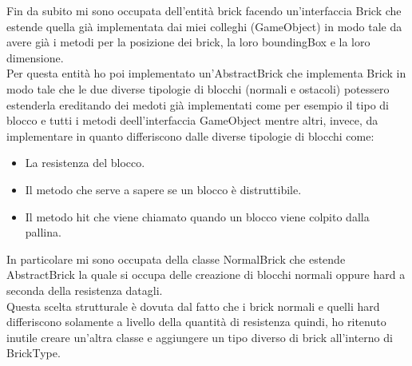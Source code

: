 \documentclass[a4paper,12pt]{report}
\begin{document}
Fin da subito mi sono occupata dell'entità brick facendo un'interfaccia Brick che estende quella già implementata dai miei colleghi (GameObject) in modo tale da avere già i metodi
per la posizione dei brick, la loro boundingBox e la loro dimensione.
\\Per questa entità ho poi implementato un'AbstractBrick che implementa Brick in modo tale che le due diverse tipologie di blocchi (normali e ostacoli) potessero estenderla ereditando dei medoti
già implementati come per esempio il tipo di blocco e tutti i metodi deell'interfaccia GameObject mentre altri, invece, da implementare in quanto differiscono dalle diverse tipologie di blocchi come:
\begin{itemize}
    \item La resistenza del blocco.
    \item Il metodo che serve a sapere se un blocco è distruttibile.
    \item Il metodo hit che viene chiamato quando un blocco viene colpito dalla pallina.
\end{itemize}
In particolare mi sono occupata della classe NormalBrick che estende AbstractBrick la quale si occupa delle creazione di blocchi normali oppure hard a seconda della resistenza datagli.
\\Questa scelta strutturale è dovuta dal fatto che i brick normali e quelli hard differiscono solamente a livello della quantità di resistenza quindi, ho ritenuto inutile creare un'altra classe e
aggiungere un tipo diverso di brick all'interno di BrickType.
\end{document}
